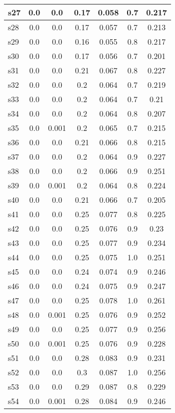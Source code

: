 \documentclass{article}
\begin{document}
\begin{tabular}{|l|c|c|c|c|c|c|}
\hline
s27 &0.0 & 0.0 & 0.17 & 0.058 & 0.7 & 0.217\\
\hline
s28 &0.0 & 0.0 & 0.17 & 0.057 & 0.7 & 0.213\\
\hline
s29 &0.0 & 0.0 & 0.16 & 0.055 & 0.8 & 0.217\\
\hline
s30 &0.0 & 0.0 & 0.17 & 0.056 & 0.7 & 0.201\\
\hline
s31 &0.0 & 0.0 & 0.21 & 0.067 & 0.8 & 0.227\\
\hline
s32 &0.0 & 0.0 & 0.2 & 0.064 & 0.7 & 0.219\\
\hline
s33 &0.0 & 0.0 & 0.2 & 0.064 & 0.7 & 0.21\\
\hline
s34 &0.0 & 0.0 & 0.2 & 0.064 & 0.8 & 0.207\\
\hline
s35 &0.0 & 0.001 & 0.2 & 0.065 & 0.7 & 0.215\\
\hline
s36 &0.0 & 0.0 & 0.21 & 0.066 & 0.8 & 0.215\\
\hline
s37 &0.0 & 0.0 & 0.2 & 0.064 & 0.9 & 0.227\\
\hline
s38 &0.0 & 0.0 & 0.2 & 0.066 & 0.9 & 0.251\\
\hline
s39 &0.0 & 0.001 & 0.2 & 0.064 & 0.8 & 0.224\\
\hline
s40 &0.0 & 0.0 & 0.21 & 0.066 & 0.7 & 0.205\\
\hline
s41 &0.0 & 0.0 & 0.25 & 0.077 & 0.8 & 0.225\\
\hline
s42 &0.0 & 0.0 & 0.25 & 0.076 & 0.9 & 0.23\\
\hline
s43 &0.0 & 0.0 & 0.25 & 0.077 & 0.9 & 0.234\\
\hline
s44 &0.0 & 0.0 & 0.25 & 0.075 & 1.0 & 0.251\\
\hline
s45 &0.0 & 0.0 & 0.24 & 0.074 & 0.9 & 0.246\\
\hline
s46 &0.0 & 0.0 & 0.24 & 0.075 & 0.9 & 0.247\\
\hline
s47 &0.0 & 0.0 & 0.25 & 0.078 & 1.0 & 0.261\\
\hline
s48 &0.0 & 0.001 & 0.25 & 0.076 & 0.9 & 0.252\\
\hline
s49 &0.0 & 0.0 & 0.25 & 0.077 & 0.9 & 0.256\\
\hline
s50 &0.0 & 0.001 & 0.25 & 0.076 & 0.9 & 0.228\\
\hline
s51 &0.0 & 0.0 & 0.28 & 0.083 & 0.9 & 0.231\\
\hline
s52 &0.0 & 0.0 & 0.3 & 0.087 & 1.0 & 0.256\\
\hline
s53 &0.0 & 0.0 & 0.29 & 0.087 & 0.8 & 0.229\\
\hline
s54 &0.0 & 0.001 & 0.28 & 0.084 & 0.9 & 0.246\\

\end{tabular}
\end{document}
